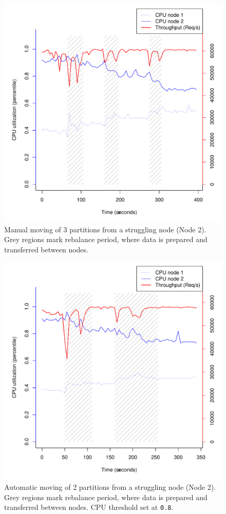 \begin{figure}[h]
    \centering
    \includegraphics[width=1.2\textwidth]{results/rebalance_originalsrc}
    \caption{Manual moving of 3 partitions from a struggling node (Node 2). Grey regions mark rebalance period, where data is prepared and transferred between nodes.}
    \label{fig:adaptive}
\end{figure}

\begin{figure}[h]
    \centering
    \includegraphics[width=1.2\textwidth]{results/adaptive_plot}
    \caption{Automatic moving of 2 partitions from a struggling node (Node 2). Grey regions mark rebalance period, where data is prepared and transferred between nodes. CPU threshold set at \texttt{0.8}.}
    \label{fig:adaptive}
\end{figure}

